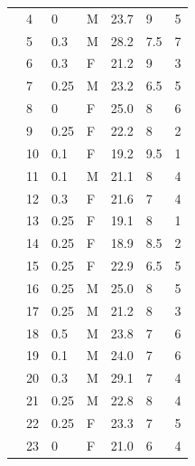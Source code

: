\begin{longtable}{@{\extracolsep{\fill}}lllllll@{}}
	               	& 4  & 0              & M      & 23.7 			& 9             	& 5               \\
	               	& 5  & 0.3            & M      & 28.2 			& 7.5           	& 7               \\
	               	& 6  & 0.3            & F      & 21.2 			& 9             	& 3               \\
	               	& 7  & 0.25           & M      & 23.2 			& 6.5           	& 5               \\
	               	& 8  & 0              & F      & 25.0 			& 8             	& 6               \\
	               	& 9  & 0.25           & F      & 22.2 			& 8             	& 2               \\
	               	& 10 & 0.1            & F      & 19.2 			& 9.5           	& 1               \\
	               	& 11 & 0.1            & M      & 21.1 			& 8             	& 4               \\
	               	& 12 & 0.3            & F      & 21.6 			& 7             	& 4               \\
	               	& 13 & 0.25           & F      & 19.1 			& 8             	& 1               \\
	               	& 14 & 0.25           & F      & 18.9 			& 8.5           	& 2               \\
	               	& 15 & 0.25           & F      & 22.9 			& 6.5           	& 5               \\
	               	& 16 & 0.25           & M      & 25.0 			& 8             	& 5               \\
	               	& 17 & 0.25           & M      & 21.2 			& 8             	& 3               \\
	               	& 18 & 0.5            & M      & 23.8 			& 7             	& 6               \\
	               	& 19 & 0.1            & M      & 24.0 			& 7             	& 6               \\
	               	& 20 & 0.3            & M      & 29.1 			& 7             	& 4               \\
	               	& 21 & 0.25           & M      & 22.8 			& 8             	& 4               \\
	               	& 22 & 0.25           & F      & 23.3 			& 7             	& 5               \\
	               	& 23 & 0              & F      & 21.0 			& 6             	& 4               \\

\end{longtable}
